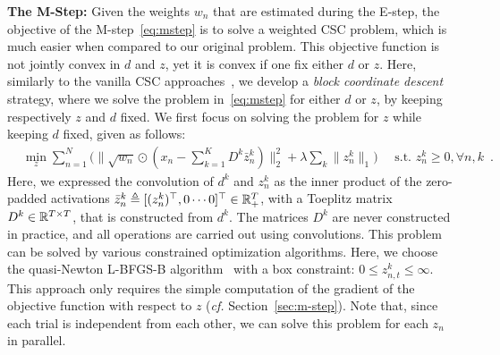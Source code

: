 


\textbf{The M-Step:} 
Given the weights $w_n$ that are estimated during the E-step, the objective of the M-step~\eqref{eq:mstep} is to solve a weighted \ac{CSC} problem, which is much easier when compared to our original problem. 
%
This objective function is not jointly convex in $d$ and $z$, yet it is convex if one fix
either $d$ or $z$.
Here, similarly to the vanilla \ac{CSC} approaches~\citep{gips2017discovering,Grosse-etal:2007}, we develop a \emph{block coordinate descent} strategy, where we solve the problem in~\eqref{eq:mstep} for either $d$ or $z$, by keeping respectively $z$ and $d$ fixed.
%
%
%
We first focus on solving the problem for $z$ while keeping $d$ fixed, given as follows:
\begin{align}
& \min_{z} \sum_{n=1}^{N} \Big( \|\sqrt{w_{n}} \odot (x_{n} - \sum_{k=1}^{K}D^{k} \bar{z}_{n}^{k})\|_{2}^{2} + \lambda \sum_{k}{ \|{z}_{n}^{k} \|_1}\Big) \quad \text{ s.t.  } {z}_n^k \geq 0, \forall n,k\enspace .
\label{eq:problem_definition_z}
\end{align} 
Here, we expressed the convolution of $d^k$ and $z_n^k$ as the inner product of the zero-padded activations $\bar{z}_n^k \triangleq [(z_n^k)^\top, 0 \cdots 0]^\top \in \mathbb{R}^{T}_+$, with a Toeplitz matrix $D^k \in \mathbb{R}^{T \times T}$, that is constructed from $d^k$.
The matrices $D^k$ are never constructed in practice, and all operations are carried out using convolutions.
This problem can be solved by various constrained optimization algorithms. Here, we choose the quasi-Newton L-BFGS-B algorithm~\cite{byrd1995limited} with a box constraint: $0 \leq z_{n,t}^k \leq \infty$. This approach only requires the simple computation of the gradient of the objective function with respect to $z$ (\textit{cf.} Section~\ref{sec:m-step}). Note that, since each trial is independent from each other, we can solve this problem for each $z_n$ in parallel. 

